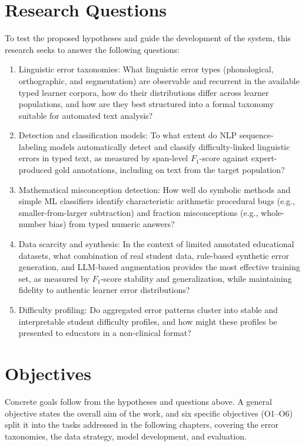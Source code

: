 \section{Research Questions}
\label{sec:questions}

To test the proposed hypotheses and guide the development of the system, this research seeks to answer the following questions:

\begin{enumerate}
    \item[\textbf{Q1}] Linguistic error taxonomies: What linguistic error types (phonological, orthographic, and segmentation) are observable and recurrent in the available typed learner corpora, how do their distributions differ across learner populations, and how are they best structured into a formal taxonomy suitable for automated text analysis?
    \item[\textbf{Q2}] Detection and classification models: To what extent do NLP sequence-labeling models automatically detect and classify difficulty-linked linguistic errors in typed text, as measured by span-level \(F_1\)-score against expert-produced gold annotations, including on text from the target population?
    \item[\textbf{Q3}] Mathematical misconception detection: How well do symbolic methods and simple ML classifiers identify characteristic arithmetic procedural bugs (e.g., smaller-from-larger subtraction) and fraction misconceptions (e.g., whole-number bias) from typed numeric answers?
    \item[\textbf{Q4}] Data scarcity and synthesis: In the context of limited annotated educational datasets, what combination of real student data, rule-based synthetic error generation, and LLM-based augmentation provides the most effective training set, as measured by \(F_1\)-score stability and generalization, while maintaining fidelity to authentic learner error distributions?
    \item[\textbf{Q5}] Difficulty profiling: Do aggregated error patterns cluster into stable and interpretable student difficulty profiles, and how might these profiles be presented to educators in a non-clinical format?
\end{enumerate}

\section{Objectives}
\label{sec:objectives}

Concrete goals follow from the hypotheses and questions above. A general objective states the overall aim of the work, and six specific objectives (O1--O6) split it into the tasks addressed in the following chapters, covering the error taxonomies, the data strategy, model development, and evaluation.

